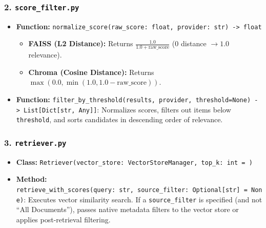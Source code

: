 \documentclass[
]{article}
\providecommand{\tightlist}{%
  \setlength{\itemsep}{0pt}\setlength{\parskip}{0pt}}
\begin{document}
\subsubsection{\texorpdfstring{2.
\texttt{score\_\allowbreak filter.\allowbreak py}}{2. score\_filter.py}}\label{score_filter.py}

\begin{itemize}
\tightlist
\item
  \textbf{Function:}
  \texttt{normalize\_\allowbreak score(\allowbreak raw\_\allowbreak score:\ \allowbreak float,\allowbreak \ \allowbreak provider:\ \allowbreak str)\allowbreak \ \allowbreak -\textgreater{}\allowbreak \ \allowbreak float}

  \begin{itemize}
  \tightlist
  \item
    \textbf{FAISS (L2 Distance):} Returns
    \(\frac{1.0}{1.0 + \text{raw\_score}}\) (\(0\) distance
    \(\rightarrow 1.0\) relevance).
  \item
    \textbf{Chroma (Cosine Distance):} Returns
    \(\max(0.0, \min(1.0, 1.0 - \text{raw\_score}))\).
  \end{itemize}
\item
  \textbf{Function:}
  \texttt{filter\_\allowbreak by\_\allowbreak threshold(\allowbreak results,\allowbreak \ \allowbreak provider,\allowbreak \ \allowbreak threshold=\allowbreak None)\allowbreak \ \allowbreak -\textgreater{}\allowbreak \ \allowbreak List{[}Dict{[}str,\allowbreak \ \allowbreak Any{]}{]}}:
  Normalizes scores, filters out items below \texttt{threshold}, and
  sorts candidates in descending order of relevance.
\end{itemize}

\subsubsection{\texorpdfstring{3.
\texttt{retriever.\allowbreak py}}{3. retriever.py}}\label{retriever.py}

\begin{itemize}
\tightlist
\item
  \textbf{Class:}
  \texttt{Retriever(\allowbreak vector\_\allowbreak store:\ \allowbreak VectorStoreManager,\allowbreak \ \allowbreak top\_\allowbreak k:\ \allowbreak int\ \allowbreak =\allowbreak \ )\allowbreak }
\item
  \textbf{Method:}
  \texttt{retrieve\_\allowbreak with\_\allowbreak scores(\allowbreak query:\ \allowbreak str,\allowbreak \ \allowbreak source\_\allowbreak filter:\ \allowbreak Optional{[}str{]}\ \allowbreak =\allowbreak \ \allowbreak None)\allowbreak }:
  Executes vector similarity search. If a \texttt{source\_\allowbreak filter} is
  specified (and not ``All Documents''), passes native metadata filters
  to the vector store or applies post-retrieval filtering.
\end{itemize}
\end{document}
